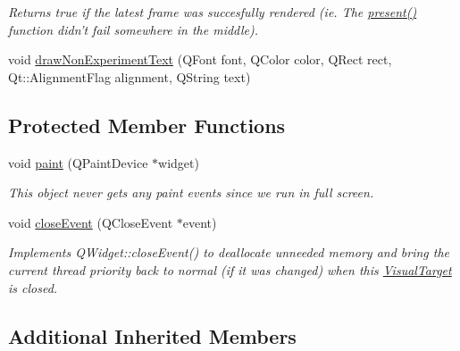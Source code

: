 \begin{DoxyCompactItemize}
\begin{DoxyCompactList}\small\item\em Returns true if the latest frame was succesfully rendered (ie. The \hyperlink{class_picto_1_1_d3_d_visual_target_ae40201fd4e6f0a866ff7af9b95ea1c9d}{present()} function didn't fail somewhere in the middle). \end{DoxyCompactList}\item 
void \hyperlink{class_picto_1_1_d3_d_visual_target_ab3932bc20c9f1e618e2cf1d4e8a9d3a6}{draw\-Non\-Experiment\-Text} (Q\-Font font, Q\-Color color, Q\-Rect rect, Qt\-::\-Alignment\-Flag alignment, Q\-String text)
\end{DoxyCompactItemize}
\subsection*{Protected Member Functions}
\begin{DoxyCompactItemize}
\item 
\hypertarget{class_picto_1_1_d3_d_visual_target_a03497fd8b0722b14db49e32efd05d2db}{void \hyperlink{class_picto_1_1_d3_d_visual_target_a03497fd8b0722b14db49e32efd05d2db}{paint} (Q\-Paint\-Device $\ast$widget)}\label{class_picto_1_1_d3_d_visual_target_a03497fd8b0722b14db49e32efd05d2db}

\begin{DoxyCompactList}\small\item\em This object never gets any paint events since we run in full screen. \end{DoxyCompactList}\item 
\hypertarget{class_picto_1_1_d3_d_visual_target_a51661155ec606aca79814cb68ea2ba13}{void \hyperlink{class_picto_1_1_d3_d_visual_target_a51661155ec606aca79814cb68ea2ba13}{close\-Event} (Q\-Close\-Event $\ast$event)}\label{class_picto_1_1_d3_d_visual_target_a51661155ec606aca79814cb68ea2ba13}

\begin{DoxyCompactList}\small\item\em Implements Q\-Widget\-::close\-Event() to deallocate unneeded memory and bring the current thread priority back to normal (if it was changed) when this \hyperlink{class_picto_1_1_visual_target}{Visual\-Target} is closed. \end{DoxyCompactList}\end{DoxyCompactItemize}
\subsection*{Additional Inherited Members}


